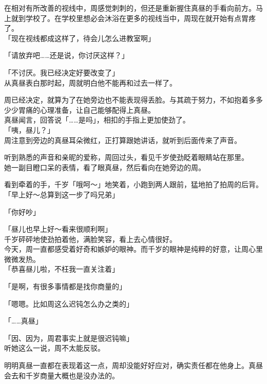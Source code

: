 在相对有所改善的视线中，周感觉刺刺的，但还是重新握住真昼的手看向前方。马上就到学校了。在学校里想必会沐浴在更多的视线当中，周现在就开始有点胃疼了。\\

「现在视线都成这样了，待会儿怎么进教室啊」

「请放弃吧……还是说，你讨厌这样？」

「不讨厌。我已经决定好要改变了」\\

从真昼表白那时起，周就明白他不能再和过去一样了。

周已经决定，就算为了在她旁边也不能表现得丢脸。与其疏于努力，不如抱着多多少少胃痛的心理准备，让自己能够配得上真昼。\\

真昼闻言，回答说「……是吗」，相扣的手指上更加使劲了。\\

「咦，昼儿？」\\

周注意到旁边的真昼耳朵微红，正打算跟她讲话，就听到后面传来了声音。

听到熟悉的声音和亲昵的爱称，周回过头，看见千岁使劲眨着眼睛站在那里。\\

她一副目瞪口呆的表情，看了眼真昼，然后看向在她旁边的周。

看到牵着的手，千岁「哦呵～」地笑着，小跑到两人跟前，猛地拍了拍周的后背。\\

「早上好～总算到这一步了吗兄弟」

「你好吵」

「昼儿也早上好～看来很顺利啊」\\

千岁砰砰地使劲拍着他，满脸笑容，看上去心情很好。\\

今天，周一直都感受着好奇和嫉妒的眼神。而千岁的眼神是纯粹的好意，让周心里微微发热。\\

「恭喜昼儿啦，不枉我一直关注着」

「是啊，有很多事情都是找你商量的」

「嗯嗯。比如周这么迟钝怎么办之类的」

「……真昼」

「因、因为，周君事实上就是很迟钝嘛」\\

听她这么一说，周不太能反驳。

明明真昼一直都在表现着这一点，周却没能好好应对，确实责任都在他身上。真昼会去和千岁商量大概也是没办法的。\\

